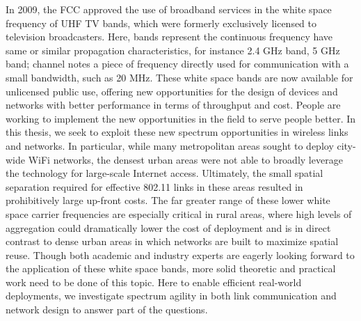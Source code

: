In 2009, the FCC approved the use of broadband services in the white space 
frequency of UHF TV bands, which were formerly exclusively licensed to 
television broadcasters. Here, bands represent the continuous frequency 
have same or similar propagation characteristics, for instance 2.4 GHz band, 
5 GHz band; channel notes a piece of frequency directly used for communication 
with a small bandwidth, such as 20 MHz. These white space bands are now available 
for unlicensed public use, offering new opportunities for the design of devices 
and networks with better performance in terms of throughput and cost. 
People are working to implement the new opportunities in the field to serve 
people better. In this thesis, we seek to exploit these new spectrum opportunities 
in wireless links and networks. In particular, while many metropolitan areas sought 
to deploy city-wide WiFi networks, the densest urban areas were not able to broadly 
leverage the technology for large-scale Internet access.  Ultimately, the small 
spatial separation required for effective 802.11 links in these areas resulted in 
prohibitively large up-front costs. The far greater range of these lower white space 
carrier frequencies are especially critical in rural areas, where high levels of 
aggregation could dramatically lower the cost of deployment and is in direct 
contrast to dense urban areas in which networks are built to maximize spatial 
reuse. Though both academic and industry experts are eagerly looking forward to the 
application of these white space bands, more solid theoretic and practical work 
need to be done of this topic. Here to enable efficient real-world deployments, 
we investigate spectrum agility in both link communication and network design 
to answer part of the questions. 

